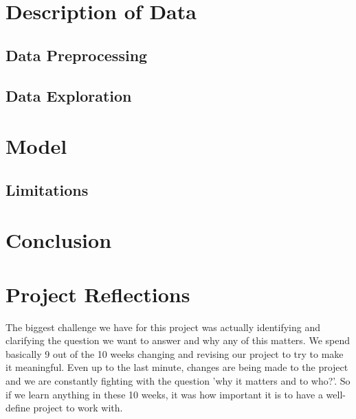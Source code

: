 \documentclass[12pt]{article}
\begin{document}


\section{Description of Data} \label{sec:Descript} 

\subsection{Data Preprocessing}


\subsection{Data Exploration}


\section{Model} \label{sec:Model}


\subsection{Limitations}

\section{Conclusion} \label{sec:Conclusion}

\section{Project Reflections} \label{sec:Reflections}
The biggest challenge we have for this project was actually identifying and clarifying the question we want to answer and why any of this matters. We spend basically 9 out of the 10 weeks changing and revising our project to try to make it meaningful. Even up to the last minute, changes are being made to the project and we are constantly fighting with the question 'why it matters and to who?'. So if we learn anything in these 10 weeks, it was how important it is to have a well-define project to work with.  
\end{document}
